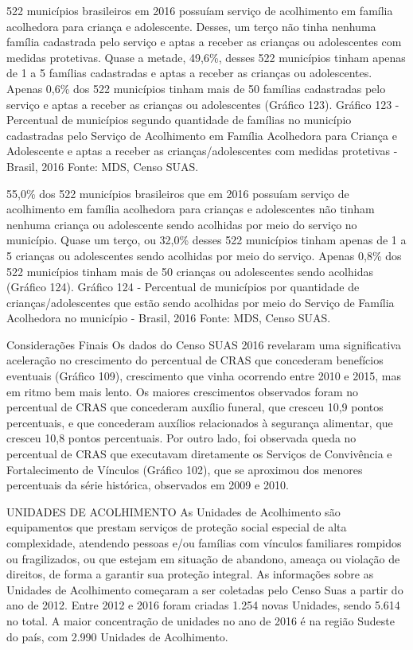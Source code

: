 \documentclass[
  brazilian]{report}
\begin{document}
522 municípios brasileiros em 2016 possuíam serviço de acolhimento em
família acolhedora para criança e adolescente. Desses, um terço não
tinha nenhuma família cadastrada pelo serviço e aptas a receber as
crianças ou adolescentes com medidas protetivas. Quase a metade, 49,6\%,
desses 522 municípios tinham apenas de 1 a 5 famílias cadastradas e
aptas a receber as crianças ou adolescentes. Apenas 0,6\% dos 522
municípios tinham mais de 50 famílias cadastradas pelo serviço e aptas a
receber as crianças ou adolescentes (Gráfico 123). Gráfico 123 -
Percentual de municípios segundo quantidade de famílias no município
cadastradas pelo Serviço de Acolhimento em Família Acolhedora para
Criança e Adolescente e aptas a receber as crianças/adolescentes com
medidas protetivas - Brasil, 2016 Fonte: MDS, Censo SUAS.

55,0\% dos 522 municípios brasileiros que em 2016 possuíam serviço de
acolhimento em família acolhedora para crianças e adolescentes não
tinham nenhuma criança ou adolescente sendo acolhidas por meio do
serviço no município. Quase um terço, ou 32,0\% desses 522 municípios
tinham apenas de 1 a 5 crianças ou adolescentes sendo acolhidas por meio
do serviço. Apenas 0,8\% dos 522 municípios tinham mais de 50 crianças
ou adolescentes sendo acolhidas (Gráfico 124). Gráfico 124 - Percentual
de municípios por quantidade de crianças/adolescentes que estão sendo
acolhidas por meio do Serviço de Família Acolhedora no município -
Brasil, 2016 Fonte: MDS, Censo SUAS.

Considerações Finais Os dados do Censo SUAS 2016 revelaram uma
significativa aceleração no crescimento do percentual de CRAS que
concederam benefícios eventuais (Gráfico 109), crescimento que vinha
ocorrendo entre 2010 e 2015, mas em ritmo bem mais lento. Os maiores
crescimentos observados foram no percentual de CRAS que concederam
auxílio funeral, que cresceu 10,9 pontos percentuais, e que concederam
auxílios relacionados à segurança alimentar, que cresceu 10,8 pontos
percentuais. Por outro lado, foi observada queda no percentual de CRAS
que executavam diretamente os Serviços de Convivência e Fortalecimento
de Vínculos (Gráfico 102), que se aproximou dos menores percentuais da
série histórica, observados em 2009 e 2010.

UNIDADES DE ACOLHIMENTO As Unidades de Acolhimento são equipamentos que
prestam serviços de proteção social especial de alta complexidade,
atendendo pessoas e/ou famílias com vínculos familiares rompidos ou
fragilizados, ou que estejam em situação de abandono, ameaça ou violação
de direitos, de forma a garantir sua proteção integral. As informações
sobre as Unidades de Acolhimento começaram a ser coletadas pelo Censo
Suas a partir do ano de 2012. Entre 2012 e 2016 foram criadas 1.254
novas Unidades, sendo 5.614 no total. A maior concentração de unidades
no ano de 2016 é na região Sudeste do país, com 2.990 Unidades de
Acolhimento.
\end{document}
